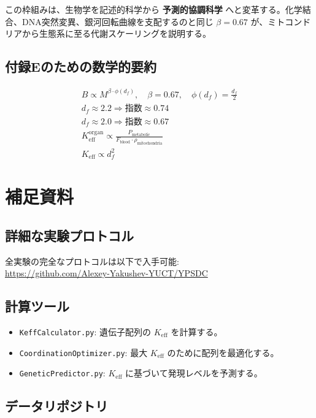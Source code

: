 \documentclass[12pt]{article}
\newcommand{\Keff}{K_{\mathrm{eff}}}
\begin{document}
	この枠組みは、生物学を記述的科学から \textbf{予測的協調科学} へと変革する。化学結合、DNA突然変異、銀河回転曲線を支配するのと同じ \(\beta = 0.67\) が、ミトコンドリアから生態系に至る代謝スケーリングを説明する。
	
	\subsection{付録Eのための数学的要約}
	
	\begin{align}
		\boxed{B \propto M^{\beta \cdot \phi(d_f)},\quad \beta = 0.67,\quad \phi(d_f) = \frac{d_f}{2}} \\
		\boxed{d_f \approx 2.2 \Rightarrow \text{指数} \approx 0.74} \\
		\boxed{d_f \approx 2.0 \Rightarrow \text{指数} \approx 0.67} \\
		\boxed{\Keff^{\text{organ}} \propto \frac{P_{\text{metabolic}}}{F_{\text{blood}} \cdot \rho_{\text{mitochondria}}}} \\
		\boxed{\Keff \propto d_f^{2}}
	\end{align}
	
	\appendix
	\section{補足資料}
	
	\subsection{詳細な実験プロトコル}
	
	全実験の完全なプロトコルは以下で入手可能:\\
	\url{https://github.com/Alexey-Yakushev-YUCT/YPSDC}
	
	\subsection{計算ツール}
	
	\begin{itemize}
		\item \texttt{KeffCalculator.py}: 遺伝子配列の $K_{\text{eff}}$ を計算する。
		\item \texttt{CoordinationOptimizer.py}: 最大 $K_{\text{eff}}$ のために配列を最適化する。
		\item \texttt{GeneticPredictor.py}: $K_{\text{eff}}$ に基づいて発現レベルを予測する。
	\end{itemize}
	
	\subsection{データリポジトリ}
	
\end{document}
